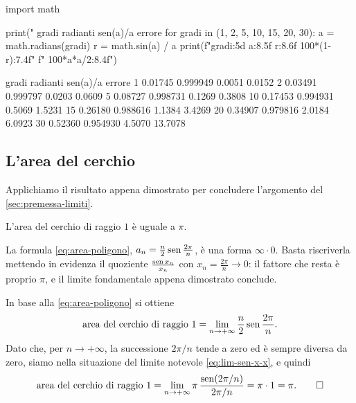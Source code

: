 \begin{python}
import math

print(" gradi   radianti   sen(a)/a   errore %
for gradi in (1, 2, 5, 10, 15, 20, 30):
    a = math.radians(gradi)
    r = math.sin(a) / a
    print(f"{gradi:5d}   {a:8.5f}   {r:8.6f}   {100*(1-r):7.4f}"
          f"    {100*a*a/2:8.4f}")
\end{python}
\begin{risultato}
 gradi   radianti   sen(a)/a   errore %
    1    0.01745   0.999949    0.0051      0.0152
    2    0.03491   0.999797    0.0203      0.0609
    5    0.08727   0.998731    0.1269      0.3808
   10    0.17453   0.994931    0.5069      1.5231
   15    0.26180   0.988616    1.1384      3.4269
   20    0.34907   0.979816    2.0184      6.0923
   30    0.52360   0.954930    4.5070     13.7078
\end{risultato}

\subsection{L'area del cerchio}

Applichiamo il risultato appena dimostrato per concludere l'argomento del
\cref{sec:premessa-limiti}.

\begin{teorema}\label{teo:area-cerchio}
L'area del cerchio di raggio $1$ è uguale a $\pi$.
\end{teorema}

\begin{schema}
\end{schema}

\begin{strategia}
La formula \eqref{eq:area-poligono}, $a_{n}=\frac n2\operatorname{sen}\frac{2\pi}n$, è una forma
$\infty\cdot0$. Basta riscriverla mettendo in evidenza il quoziente
$\frac{\operatorname{sen} x_{n}}{x_{n}}$ con $x_{n}=\frac{2\pi}n\to0$: il fattore che resta è proprio
$\pi$, e il limite fondamentale appena dimostrato conclude.
\end{strategia}

\begin{dimostrazione}
In base alla \eqref{eq:area-poligono} si ottiene
\begin{equation}\label{eq:area-cerchio-1}
  \text{area del cerchio di raggio }1=\lim_{n\to+\infty}\frac n2\operatorname{sen}\frac{2\pi}{n}.
\end{equation}
Dato che, per $n\to+\infty$, la successione $2\pi/n$ tende a zero ed è sempre diversa da
zero, siamo nella situazione del limite notevole \eqref{eq:lim-sen-x-x}, e quindi
\begin{equation}\label{eq:area-cerchio-2}
  \text{area del cerchio di raggio }1=\lim_{n\to+\infty}\pi\,\frac{\operatorname{sen}(2\pi/n)}{2\pi/n}=\pi\cdot1=\pi. \qedhere
\end{equation}
\end{dimostrazione}

